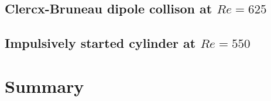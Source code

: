 
\subsection{Clercx-Bruneau dipole collison at $Re=625$}

\subsection{Impulsively started cylinder at $Re=550$}

\section{Summary}

